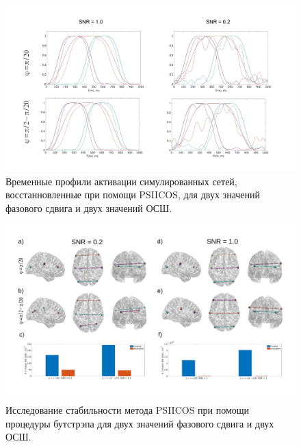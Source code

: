 \documentclass[12pt]{beamer}
\begin{document}
\begin{frame}
\begin{figure}[!ht]
    \includegraphics[width=1\textwidth]{../images/psiicos_paper/Figure6_hr.jpg}
    {\small Временные профили активации симулированных сетей, восстанновленные при помощи PSIICOS, для двух значений фазового сдвига и двух значений ОСШ.} %
\end{figure}%
\end{frame}

\begin{frame}
\begin{figure}[!ht]
 \includegraphics[width=\textwidth]{../images/psiicos_paper/Figure8_hr.jpg}
 {\small Исследование стабильности метода PSIICOS при помощи процедуры бутстрэпа для
 двух значений фазового сдвига и двух ОСШ.}\label{fig:08}
\end{figure}%
\end{frame}
\end{document}
